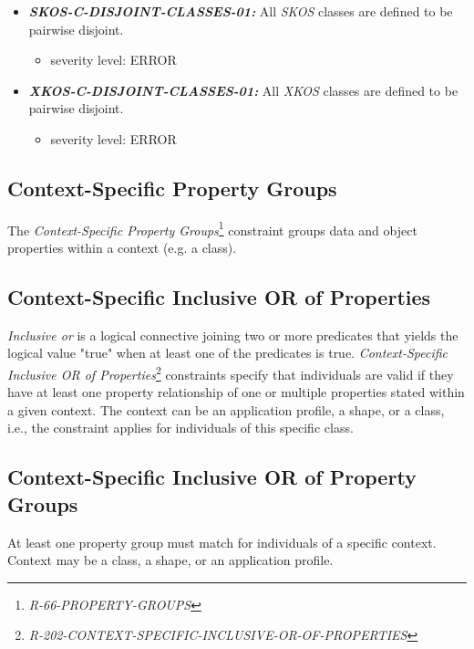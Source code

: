 \documentclass{llncs}
\begin{document}
\begin{itemize}
	\item \textbf{{\em SKOS-C-DISJOINT-CLASSES-01:}} 
All \emph{SKOS} classes are defined to be pairwise disjoint.
\begin{itemize}
		\item severity level: ERROR
	\end{itemize}
\end{itemize}

\begin{itemize}
	\item \textbf{{\em XKOS-C-DISJOINT-CLASSES-01:}} 
All \emph{XKOS} classes are defined to be pairwise disjoint.
\begin{itemize}
		\item severity level: ERROR
	\end{itemize}
\end{itemize}

\subsection{Context-Specific Property Groups}

The \emph{Context-Specific Property Groups}\footnote{\emph{R-66-PROPERTY-GROUPS}} constraint groups data and object properties within a context (e.g. a class).

\subsection{Context-Specific Inclusive OR of Properties}

\emph{Inclusive or} is a logical connective joining two or more predicates that yields the logical value "true" when at least one of the predicates is true.
\emph{Context-Specific Inclusive OR of Properties}\footnote{\emph{R-202-CONTEXT-SPECIFIC-INCLUSIVE-OR-OF-PROPERTIES}} constraints specify that individuals are valid if they have at least one property relationship of one or multiple properties stated within a given context.
The context can be an application profile, a shape, or a class, i.e., the constraint applies for individuals of this specific class.

\subsection{Context-Specific Inclusive OR of Property Groups}

At least one property group must match for individuals of a specific context. 
Context may be a class, a shape, or an application profile.
\end{document}
